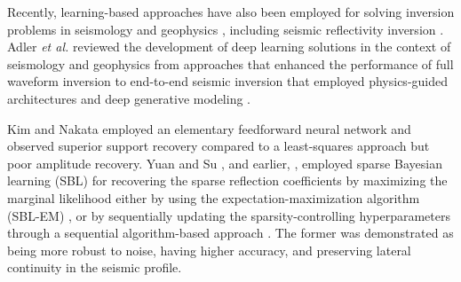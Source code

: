 \documentclass[journal]{IEEEtran}
\begin{document}
Recently, learning-based approaches have also been employed for solving inversion problems in seismology and geophysics \cite{yuan2013spectral, yuan2019seismic, russell2019machine, bergen2019machine, adler2021deep, lewis2017deep, richardson2018seismic, ovcharenko2019deep, sun2020extrapolated, araya2018deep, kim2018geophysical, wang2018velocity, wu2018inversionnet, yang2019deep, adler2019deep, das2019convolutional, park2020automatic, wu2020seismic, wang2020velocity, biswas2019prestack, alfarraj2019semi, araya2019deep, wang2019seismic, mosser2020stochastic, zhang2020data}, including seismic reflectivity inversion \cite{yuan2013spectral, yuan2019seismic, russell2019machine, adler2021deep, kim2018geophysical, biswas2019prestack}. Adler {\it et al.} reviewed the development of deep learning solutions in the context of seismology and geophysics from approaches that enhanced the performance of full waveform inversion \cite{lewis2017deep, richardson2018seismic, ovcharenko2019deep, sun2020extrapolated} to end-to-end seismic inversion \cite{araya2018deep, kim2018geophysical, wang2018velocity, wu2018inversionnet, yang2019deep, adler2019deep, das2019convolutional, park2020automatic, wu2020seismic, wang2020velocity} that employed physics-guided architectures \cite{biswas2019prestack, alfarraj2019semi} and deep generative modeling \cite{araya2019deep, wang2019seismic, mosser2020stochastic, zhang2020data}.

Kim and Nakata \cite{kim2018geophysical} employed an elementary feedforward neural network and observed superior support recovery compared to a least-squares approach but poor amplitude recovery. Yuan and Su \cite{yuan2019seismic}, and earlier, \cite{yuan2013spectral}, employed sparse Bayesian learning (SBL) for recovering the sparse reflection coefficients by maximizing the marginal likelihood either by using the expectation-maximization algorithm (SBL-EM) \cite{wipf2004sparse, yuan2019seismic}, or by sequentially updating the sparsity-controlling hyperparameters through a sequential algorithm-based approach \cite{yuan2013spectral}. The former \cite{wipf2004sparse, yuan2019seismic} was demonstrated as being more robust to noise, having higher accuracy, and preserving lateral continuity in the seismic profile. 
\end{document}
